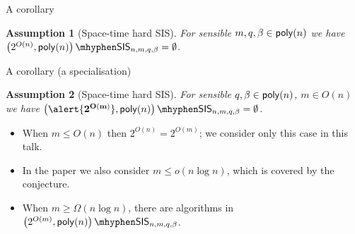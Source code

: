\documentclass[xcolor=table,10pt,aspectratio=169]{beamer}
\newtheorem{assumption}{Assumption}
\newcommand{\SIS}{\ensuremath{\mathsf{SIS}}\xspace}
\begin{document}
\begin{frame}[label={sec:org1e83816}]{A corollary}
\begin{assumption}[Space-time hard SIS]
For sensible \(m,q,\beta \in \poly[n]\) we have \(\left(2^{O(n)}, \poly[n]\right)\mhyphen\SIS_{n,m,q,\beta} = \emptyset\).
\label{ass:space-time-sis}
\end{assumption}
\end{frame}
\begin{frame}[label={sec:org1eefe10}]{A corollary (a specialisation)}
\begin{assumption}[Space-time hard SIS]
For sensible \(q,\beta \in \poly[n]\), \(m \in O(n)\) we have \(\left(\alert{\mathbf{2^{O(m)}}}, \poly[n]\right)\mhyphen\SIS_{n,m,q,\beta} = \emptyset\).
\label{ass:space-time-sis-m}
\end{assumption}

\begin{itemize}
\item When \(m \leq O(n)\) then \(2^{O(n)} = 2^{O(m)}\); we consider only this case in this talk.
\item In the paper we also consider \(m \leq o(n \log n)\), which is covered by the conjecture.
\item When \(m \ge \Omega(n \log n)\), there are algorithms in \(\left(2^{O(m)}, \poly[n]\right)\mhyphen\SIS_{n,m,q,\beta}\).
\end{itemize}
\end{frame}
\end{document}
